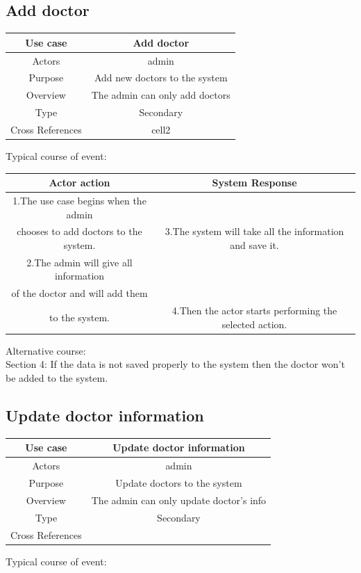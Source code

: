 \documentclass[14pt,a4paper,calibribody]{article}
\begin{document}
\subsection{Add doctor}
\begin{center}
\begin{tabular}{ |c| c| }
\hline
Use case & Add doctor\\ 
\hline
Actors & admin\\  
\hline
Purpose & Add new doctors to the system\\ 
\hline
Overview & The admin can only add doctors\\ 
\hline
Type & Secondary\\ 
\hline
Cross References& cell2\\ 
\hline
\end{tabular}
\end{center}
Typical course of event:

\begin{center}
\begin{tabular}{ |c| c| }
\hline
Actor action & System Response \\ 
\hline
1.The use case begins when the admin\\ chooses to add doctors to the system. & 3.The system will take all the information and save it. \\  
\hline
2.The admin will give all information\\ of the doctor and will add them\\ to the system. & 4.Then the actor starts performing the selected action.\\  
\hline
\end{tabular}
\end{center}
Alternative course:\\
Section 4: If the data is not saved properly to the system then the doctor won’t be added to the system.

\subsection{Update doctor information}
\begin{center}
\begin{tabular}{ |c| c| }
\hline
Use case & Update doctor information \\ 
\hline
Actors & admin \\  
\hline
Purpose & Update doctors to the system\\ 
\hline
Overview & The admin can only update doctor’s info \\ 
\hline
Type & Secondary \\ 
\hline
Cross References &  \\ 
\hline
\end{tabular}
\end{center}
Typical course of event:
\end{document}
